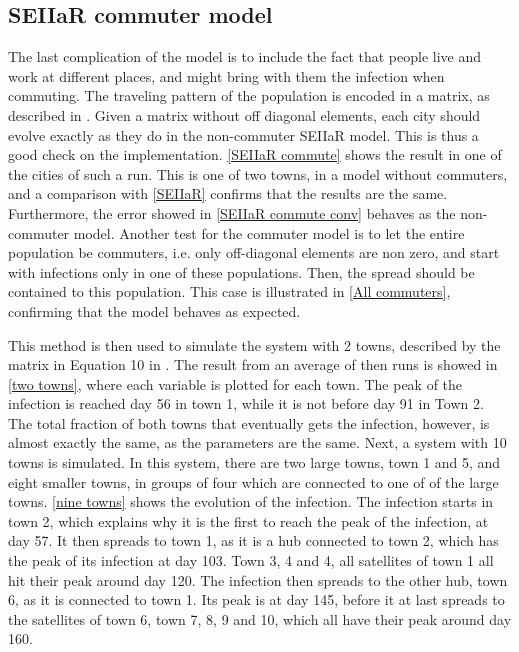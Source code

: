 \documentclass{article}
\begin{document}
    \subsection*{SEIIaR commuter model}
    The last complication of the model is to include the fact that people live and work at different places, and might bring with them the infection when commuting. 
    The traveling pattern of the population is encoded in a matrix, as described in \cite{exam}.
    Given a matrix without off diagonal elements, each city should evolve exactly as they do in the non-commuter SEIIaR model.
    This is thus a good check on the implementation.
    \autoref{SEIIaR commute} shows the result in one of the cities of such a run.
    This is one of two towns, in a model without commuters, and a comparison with \autoref{SEIIaR} confirms that the results are the same.
    Furthermore, the error showed in \autoref{SEIIaR commute conv} behaves as the non-commuter model.
    Another test for the commuter model is to let the entire population be commuters, i.e. only off-diagonal elements are non zero, and start with infections only in one of these populations.
    Then, the spread should be contained to this population.
    This case is illustrated in \autoref{All commuters}, confirming that the model behaves as expected.

    This method is then used to simulate the system with 2 towns, described by the matrix in Equation 10 in \cite{exam}.
    The result from an average of then runs is showed in \autoref{two towns}, where each variable is plotted for each town.
    The peak of the infection is reached day 56 in town 1, while it is not before day 91 in Town 2.
    The total fraction of both towns that eventually gets the infection, however, is almost exactly the same, as the parameters are the same.
    Next, a system with 10 towns is simulated. 
    In this system, there are two large towns, town 1 and 5, and eight smaller towns, in groups of four which are connected to one of of the large towns.
    \autoref{nine towns} shows the evolution of the infection.
    The infection starts in town 2, which explains why it is the first to reach the peak of the infection, at day 57.
    It then spreads to town 1, as it is a hub connected to town 2, which has the peak of its infection at day 103. 
    Town 3, 4 and 4, all satellites of town 1 all hit their peak around day 120.
    The infection then spreads to the other hub, town 6, as it is connected to town 1.
    Its peak is at day 145, before it at last spreads to the satellites of town 6, town 7, 8, 9 and 10, which all have their peak around day 160.
\end{document}
